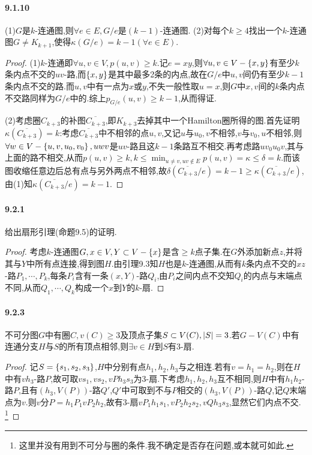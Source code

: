 \documentclass[11pt]{article}
\begin{document}
\paragraph{9.1.10}(1)$G$是$k$-连通图,则$\forall e\in E, G/e$是$(k-1)$-连通图. (2)对每个$k\geq 4$找出一个$k$-连通图$G\neq K_{k+1}$,使得$\kappa(G/e)=k-1 (\forall e\in E)$.
\begin{proof}
    (1)$k$-连通即$\forall u,v\in V, p(u,v)\geq k$.记$e=xy$,则$\forall u,v\in V-\left\{x,y\right\}$有至少$k$条内点不交的$uv$-路,而$\left\{x,y\right\}$是其中最多2条的内点,故在$G/e$中$u,v$间仍有至少$k-1$条内点不交的路.而$u,v$中有一点为$x$或$y$,不失一般性取$u=x$,则$G$中$x,v$间的$k$条内点不交路同样为$G/e$中的.综上$p_{G/e}(u,v)\geq k-1$,从而得证.

    (2)考虑圈$C_{k+3}$的补图$\overline{C_{k+3}}$,即$K_{k+3}$去掉其中一个Hamilton圈所得的图.首先证明$\kappa(\overline{C_{k+3}})=k$:考虑$\overline{C_{k+3}}$中不相邻的点$u,v$,又记$u$与$u_0,v$不相邻,$v$与$v_0,u$不相邻,则$\forall w\in V-\left\{u,v,u_0,v_0\right\}, uwv$是$uv$-路且这$k-1$条路互不相交.再考虑路$uv_0u_0v$,其与上面的路不相交,从而$p(u,v)\geq k, k\leq\min_{u\neq v, uv\notin E}p(u,v)=\kappa\leq \delta=k$.而该图收缩任意边后总有点与另外两点不相邻,故$\delta(\overline{C_{k+3}}/e)=k-1\geq\kappa(\overline{C_{k+3}}/e)$,由(1)知$\kappa(\overline{C_{k+3}}/e)=k-1$.
\end{proof}

\paragraph{9.2.1}给出扇形引理(命题9.5)的证明.
\begin{proof}
    考虑$k$-连通图$G, x\in V, Y\subset V-\left\{x\right\}$是含$\geq k$点子集.在$G$外添加新点$z$,并将其与$Y$中所有点连接,得到图$H$.由引理9.3知$H$也是$k$-连通图,从而有$k$条内点不交的$xz$-路$P_1,\cdots,P_k$,每条$P_i$含有一条$(x,Y)$-路$Q_i$,由$P_i$之间内点不交知$Q_i$的内点与末端点不同,从而$Q_1,\cdots,Q_k$构成一个$x$到$Y$的$k$-扇.
\end{proof}

\paragraph{9.2.3}不可分图$G$中有圈$C, v(C)\geq 3$及顶点子集$S\subset V(C), \left|S\right|=3$.若$G-V(C)$中有连通分支$H$与$S$的所有顶点相邻,则$\exists v\in H$到$S$有3-扇.
\begin{proof}
    记$S=\left\{s_1,s_2,s_3\right\}$,$H$中分别有点$h_1,h_2,h_3$与之相连.若有$v=h_1=h_2$,则在$H$中有$vh_3$-路$P$,故可取$vs_1, vs_2, vPh_3s_3$为3-扇.下考虑$h_1,h_2,h_3$互不相同,则$H$中有$h_1h_2$-路$P$,且有$(h_3,V(P))$-路$Q'$,$Q'$中可取到不与$P$相交的$(h_3,V(P))$-路$Q$,记$Q$末端点为$v$.则$v$分$P=h_1P_1vP_2h_2$,故有3-扇$vP_1h_1s_1, vP_2h_2s_2, vQh_3s_3$,显然它们内点不交.
    \footnote{这里并没有用到不可分与圈的条件.我不确定是否存在问题,或本就可如此.}
\end{proof}
\end{document}
